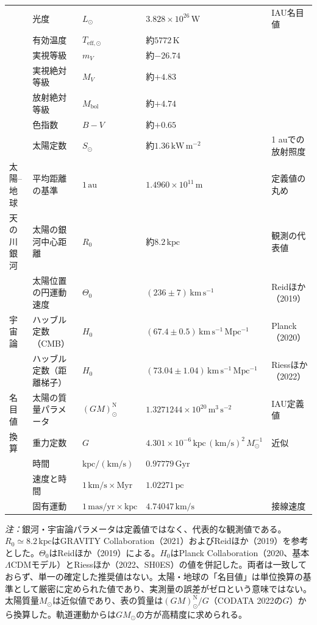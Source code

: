 {\begin{longtable}{@{}p{1.8cm}p{4.15cm}p{2.0cm}p{5.0cm}p{2.6cm}@{}}
 & 光度 & $L_\odot$ & $3.828\times10^{26}\,\mathrm W$ & IAU名目値 \\
 & 有効温度 & $T_{\mathrm{eff},\odot}$ & 約$5772\,\mathrm K$ & \\
 & 実視等級 & $m_V$ & 約$-26.74$ & \\
 & 実視絶対等級 & $M_V$ & 約$+4.83$ & \\
 & 放射絶対等級 & $M_{\mathrm{bol}}$ & 約$+4.74$ & \\
 & 色指数 & $B-V$ & 約$+0.65$ & \\
 & 太陽定数 & $S_\odot$ & 約$1.36\,\mathrm{kW\,m^{-2}}$ & 1 auでの放射照度 \\
太陽--地球 & 平均距離の基準 & $1\,\mathrm{au}$ & $1.4960\times10^{11}\,\mathrm m$ & 定義値の丸め \\
天の川銀河 & 太陽の銀河中心距離 & $R_0$ & 約$8.2\,\mathrm{kpc}$ & 観測の代表値 \\
 & 太陽位置の円運動速度 & $\Theta_0$ & $(236\pm7)\,\mathrm{km\,s^{-1}}$ & Reidほか（2019） \\
宇宙論 & ハッブル定数（CMB） & $H_0$ & $(67.4\pm0.5)\,\mathrm{km\,s^{-1}\,Mpc^{-1}}$ & Planck（2020） \\
 & ハッブル定数（距離梯子） & $H_0$ & $(73.04\pm1.04)\,\mathrm{km\,s^{-1}\,Mpc^{-1}}$ & Riessほか（2022） \\
名目値 & 太陽の質量パラメータ & $(GM)_\odot^{\mathrm N}$ & $1.3271244\times10^{20}\,\mathrm{m^3\,s^{-2}}$ & IAU定義値 \\
換算 & 重力定数 & $G$ & $4.301\times10^{-6}\,\mathrm{kpc\,(km/s)^2}\,M_\odot^{-1}$ & 近似 \\
 & 時間 & $\mathrm{kpc/(km/s)}$ & $0.97779\,\mathrm{Gyr}$ & \\
 & 速度と時間 & $1\,\mathrm{km/s}\times\mathrm{Myr}$ & $1.02271\,\mathrm{pc}$ & \\
 & 固有運動 & $1\,\mathrm{mas/yr}\times\mathrm{kpc}$ & $4.74047\,\mathrm{km/s}$ & 接線速度 \\
\end{longtable}
}
\noindent\footnotesize\textit{注：}銀河・宇宙論パラメータは定義値ではなく、代表的な観測値である。$R_0\simeq8.2\,\mathrm{kpc}$はGRAVITY Collaboration（2021）およびReidほか（2019）を参考とした。$\Theta_0$はReidほか（2019）による。$H_0$はPlanck Collaboration（2020、基本$\Lambda$CDMモデル）とRiessほか（2022、SH0ES）の値を併記した。両者は一致しておらず、単一の確定した推奨値はない。太陽・地球の「名目値」は単位換算の基準として厳密に定められた値であり、実測量の誤差がゼロという意味ではない。太陽質量$M_\odot$は近似値であり、表の質量は$(GM)_\odot^{\mathrm N}/G$（CODATA 2022の$G$）から換算した。軌道運動からは$GM_\odot$の方が高精度に求められる。\normalsize

